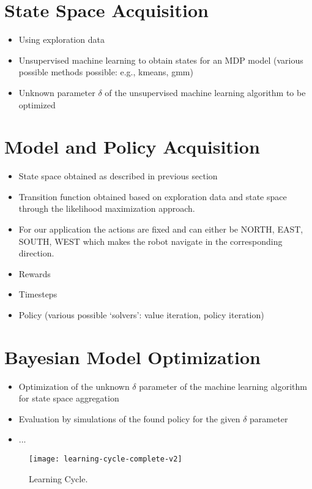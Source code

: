\section{State Space Acquisition}
\label{sec:state-space-aggregation}

% 

\begin{itemize}
	\item Using exploration data
	\item Unsupervised machine learning to obtain states for an MDP model (various possible methods possible: e.g., kmeans, gmm)
	\item Unknown parameter $\delta$ of the unsupervised machine learning algorithm to be optimized
\end{itemize}

\section{Model and Policy Acquisition}
\label{sec:model-policy-acquisition}

% 

\begin{itemize}
	\item State space obtained as described in previous section
	\item Transition function obtained based on exploration data and state space through the likelihood maximization approach.
	\item For our application the actions are fixed and can either be \textsc{NORTH}, \textsc{EAST}, \textsc{SOUTH}, \textsc{WEST} which makes the robot navigate in the corresponding direction.
	\item Rewards
	\item Timesteps
	\item Policy (various possible `solvers': value iteration, policy iteration)
\end{itemize}

\section{Bayesian Model Optimization}
\label{sec:bayesian-model-optimization}

% 

\begin{itemize}
	\item Optimization of the unknown $\delta$ parameter of the machine learning algorithm for state space aggregation
	\item Evaluation by simulations of the found policy for the given $\delta$ parameter
	\item ...
\end{itemize}

\begin{figure}[t]
	\centering
	\texttt{[image: learning-cycle-complete-v2]}
	\caption{Learning Cycle.}
	\label{fig:learning-cycle-complete}
\end{figure}
